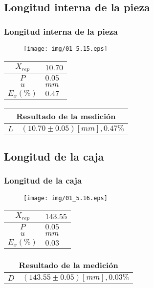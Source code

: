 \documentclass[letter,11pt]{beamer}
\begin{document}
\subsection{Longitud interna de la pieza}
\begin{frame}
\frametitle{Longitud interna de la pieza}
\vspace*{0.8cm}
\begin{figure}
\centering
\texttt{[image: img/01\_5.15.eps]}
\end{figure}
\vspace*{0.4cm}
\scriptsize
\begin{tabular}{|c|>{\centering}m{1.8cm}<{\centering}|}
\hline
$X_{rep}$ &  $10.70$ \tabularnewline \hline
      $P$ &   $0.05$ \tabularnewline \hline
      $u$ &     $mm$ \tabularnewline \hline
$E_x(\%)$ &   $0.47$ \tabularnewline \hline
\end{tabular}
\quad
\begin{tabular}{|c|>{\centering}m{5.7cm}<{\centering}|}
\hline
\multicolumn{2}{|c|}{\textbf{Resultado de la medición}} \\ \hline
$L$ & $( 10.70\pm0.05)[mm], 0.47\%$ \tabularnewline \hline
\end{tabular}
\end{frame}

\subsection{Longitud de la caja}
\begin{frame}
\frametitle{Longitud de la caja}
\vspace*{0.8cm}
\begin{figure}
\centering
\texttt{[image: img/01\_5.16.eps]}
\end{figure}
\vspace*{0.4cm}
\scriptsize
\begin{tabular}{|c|>{\centering}m{1.8cm}<{\centering}|}
\hline
$X_{rep}$ & $143.55$ \tabularnewline \hline
      $P$ &   $0.05$ \tabularnewline \hline
      $u$ &     $mm$ \tabularnewline \hline
$E_x(\%)$ &   $0.03$ \tabularnewline \hline
\end{tabular}
\quad
\begin{tabular}{|c|>{\centering}m{5.7cm}<{\centering}|}
\hline
\multicolumn{2}{|c|}{\textbf{Resultado de la medición}} \\ \hline
$D$ & $(143.55\pm0.05)[mm], 0.03\%$ \tabularnewline \hline
\end{tabular}
\end{frame}
\end{document}
